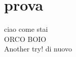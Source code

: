 \documentclass{article}
\begin{document}
    \section{prova}
        ciao come stai\\
        ORCO BOIO\\
        Another try! di nuovo
\end{document}
